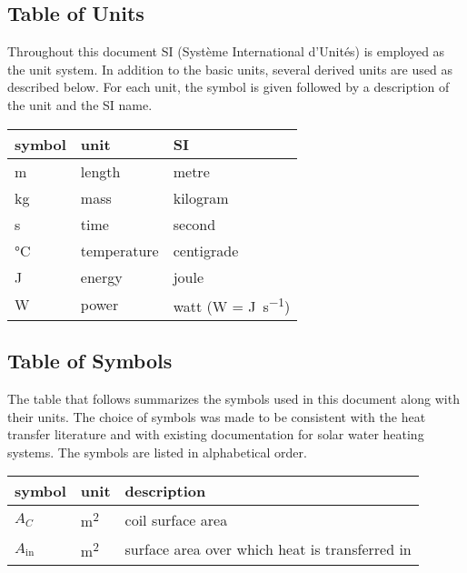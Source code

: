 \documentclass[12pt]{article}
\begin{document}
\subsection{Table of Units}

Throughout this document SI (Syst\`{e}me International d'Unit\'{e}s) is employed
as the unit system.  In addition to the basic units, several derived units are
used as described below.  For each unit, the symbol is given followed by a
description of the unit and the SI name.
~\newline

\renewcommand{\arraystretch}{1.2}
  \noindent \begin{tabular}{l l l} 
    \toprule		
    \textbf{symbol} & \textbf{unit} & \textbf{SI}\\
    \midrule 
    \si{\metre} & length & metre\\
    \si{\kilogram} & mass	& kilogram\\
    \si{\second} & time & second\\
    \si{\celsius} & temperature & centigrade\\
    \si{\joule} & energy & joule\\
    \si{\watt} & power & watt (W = \si{\joule\per\second})\\
    \bottomrule
  \end{tabular}

\subsection{Table of Symbols}

The table that follows summarizes the symbols used in this document along with
their units.  The choice of symbols was made to be consistent with the heat
transfer literature and with existing documentation for solar water heating
systems.  The symbols are listed in alphabetical order.

\renewcommand{\arraystretch}{1.2}
\noindent \begin{longtable*}{l l p{12cm}} \toprule
\textbf{symbol} & \textbf{unit} & \textbf{description}\\
\midrule 
$A_C$ & \si[per-mode=symbol] {\square\metre} & coil surface area
\\
$A_\text{in}$ & \si[per-mode=symbol] {\square\metre} & surface area over 
which heat is transferred in
\\ 
\bottomrule
\end{longtable*}
\end{document}
